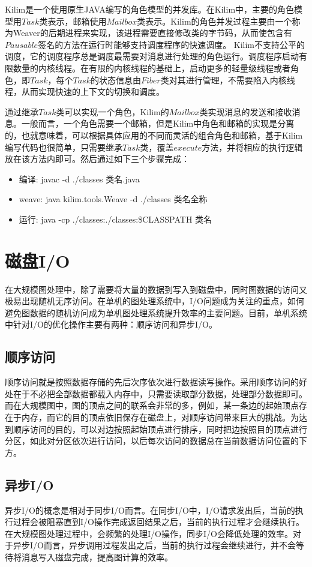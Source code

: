 Kilim\cite{srinivasan2008kilim,srinivasan2010kilim,srinivasan2006thread}是一个使用原生JAVA编写的角色模型的并发库。在Kilim中，主要的角色模型用$Task$类表示，邮箱使用$Mailbox$类表示。Kilim的角色并发过程主要由一个称为Weaver的后期进程来实现，该进程需要直接修改类的字节码，从而使包含有$Pausable$签名的方法在运行时能够支持调度程序的快速调度。
Kilim不支持公平的调度，它的调度程序总是调度最需要对消息进行处理的角色运行。调度程序启动有限数量的内核线程。在有限的内核线程的基础上，启动更多的轻量级线程或者角色，即$Task$，每个$Task$的状态信息由$Fiber$类对其进行管理，不需要陷入内核线程，从而实现快速的上下文的切换和调度。

通过继承$Task$类可以实现一个角色，Kilim的$Mailbox$类实现消息的发送和接收消息。一般而言，一个角色需要一个邮箱，但是Kilim中角色和邮箱的实现是分离的，也就意味着，可以根据具体应用的不同而灵活的组合角色和邮箱，基于Kilim编写代码也很简单，只需要继承$Task$类，覆盖$execute$方法，并将相应的执行逻辑放在该方法内即可。然后通过如下三个步骤完成：

\begin{itemize}
\item  编译: javac -d ./classes 类名.java
\item weave:   java kilim.tools.Weave -d ./classes 类名全称
\item 运行:     java -cp ./classes:./classes:\$CLASSPATH  类名
\end{itemize}

\section{磁盘I/O}
在大规模图处理中，除了需要将大量的数据到写入到磁盘中，同时图数据的访问又极易出现随机无序访问。在单机的图处理系统中，I/O问题成为关注的重点，如何避免图数据的随机访问成为单机图处理系统提升效率的主要问题。目前，单机系统中针对I/O的优化操作主要有两种：顺序访问和异步I/O。

\subsection{顺序访问}
顺序访问就是按照数据存储的先后次序依次进行数据读写操作。采用顺序访问的好处在于不必把全部数据都载入内存中，只需要读取部分数据，处理部分数据即可。而在大规模图中，图的顶点之间的联系会非常的多，例如，某一条边的起始顶点存在于内存，而它的目的顶点依旧保存在磁盘上，对顺序访问带来巨大的挑战。为达到顺序访问的目的，可以对边按照起始顶点进行排序，同时把边按照目的顶点进行分区，如此对分区依次进行访问，以后每次访问的数据总在当前数据访问位置的下方。
\subsection{异步I/O}
异步I/O的概念是相对于同步I/O而言。在同步I/O中，I/O请求发出后，当前的执行过程会被阻塞直到I/O操作完成返回结果之后，当前的执行过程才会继续执行。在大规模图处理过程中，会频繁的处理I/O操作，同步I/O会降低处理的效率。对于异步I/O而言，异步调用过程发出之后，当前的执行过程会继续进行，并不会等待将消息写入磁盘完成，提高图计算的效率。

